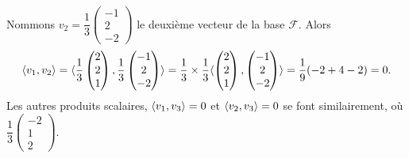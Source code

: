 {	Nommons $v_2 =  \dfrac1{3}\begin{pmatrix} -1 \\ 2 \\ -2 \end{pmatrix}$ le deuxième vecteur de la base $\mathcal{F}$.
	Alors
	\begin{align*}
		\langle v_1, v_2 \rangle = \langle \frac1{3}\begin{pmatrix} 2 \\ 2 \\ 1 \end{pmatrix}, \frac1{3}\begin{pmatrix} -1 \\ 2 \\ -2 \end{pmatrix} \rangle = \frac13 \times \frac13 \langle \begin{pmatrix} 2 \\ 2 \\ 1 \end{pmatrix}, \begin{pmatrix} -1 \\ 2 \\ -2 \end{pmatrix} \rangle = \frac19 (-2 + 4 - 2) = 0.
	\end{align*}
	Les autres produits scalaires, $\langle v_1, v_3 \rangle = 0$ et $\langle v_2, v_3 \rangle = 0$ se font similairement, où $\dfrac1{3}\begin{pmatrix} -2 \\ 1 \\ 2 \end{pmatrix}$.
	
}
